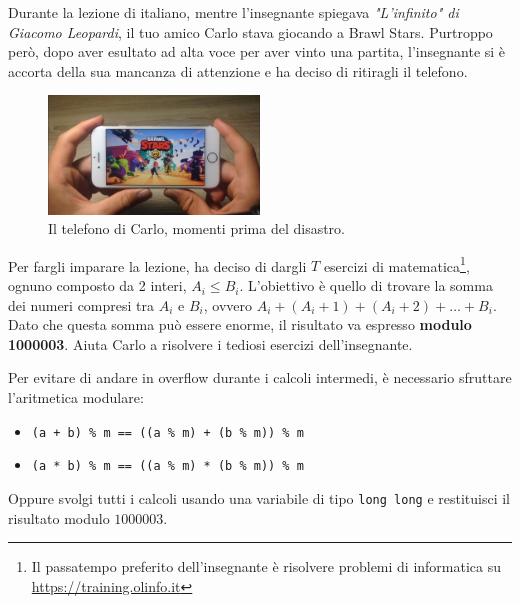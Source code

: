\usepackage{xcolor}
\usepackage{afterpage}
\usepackage{pifont,mdframed}
\usepackage[bottom]{footmisc}
\usepackage{minted}


\newcommand{\inputfile}{\texttt{stdin}}
\newcommand{\outputfile}{\texttt{stdout}}
\makeatletter
\renewcommand{\this@inputfilename}{\texttt{stdin}}
\renewcommand{\this@outputfilename}{\texttt{stdout}}
\makeatother


Durante la lezione di italiano, mentre l'insegnante spiegava \textit{"L'infinito" di Giacomo Leopardi}, il tuo amico Carlo stava giocando a Brawl Stars.
Purtroppo però, dopo aver esultato ad alta voce per aver vinto una partita, l'insegnante si è accorta della sua mancanza di attenzione e
ha deciso di ritiragli il telefono.

\begin{figure}[h]
    \centering
    \includegraphics[width=0.5\textwidth]{brawl.jpg}
    \caption{Il telefono di Carlo, momenti prima del disastro. }
\end{figure}

Per fargli imparare la lezione, ha deciso di dargli $T$ esercizi di matematica\footnote{Il passatempo preferito dell'insegnante è risolvere problemi di informatica su \url{https://training.olinfo.it}},
ognuno composto da 2 interi, $A_i \leq B_i$. L'obiettivo è quello di trovare la somma dei numeri compresi tra $A_i$ e $B_i$, ovvero
$A_i + (A_i + 1) + (A_i+2) + \dots + B_i$. Dato che questa somma può essere enorme, il risultato va espresso \textbf{modulo 1000003}. Aiuta Carlo a risolvere i tediosi esercizi dell'insegnante.

\begin{danger}
    Per evitare di andare in overflow durante i calcoli intermedi, è necessario sfruttare l'aritmetica
    modulare:
    \begin{itemize}
        \item \texttt{(a + b) \% m == ((a \% m) + (b \% m)) \% m}
        \item \texttt{(a * b) \% m == ((a \% m) * (b \% m)) \% m}
    \end{itemize}

    Oppure svolgi tutti i calcoli usando una variabile di tipo \texttt{long long} e restituisci il risultato modulo $1000003$.
\end{danger}

